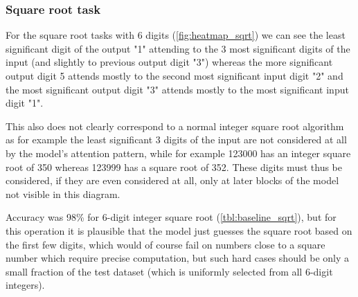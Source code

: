 \subsubsection{Square root task}


For the square root tasks with 6 digits (\cref{fig:heatmap_sqrt}) we can see the least significant digit of the output "1" attending to the 3 most significant digits of the input (and slightly to previous output digit "3") whereas the more significant output digit 5 attends mostly to the second most significant input digit "2" and the most significant output digit "3" attends mostly to the most significant input digit "1".

This also does not clearly correspond to a normal integer square root algorithm as for example the least significant 3 digits of the input are not considered at all by the model's attention pattern, while for example 123000 has an integer square root of 350 whereas 123999 has a square root of 352. These digits must thus be considered, if they are even considered at all, only at later blocks of the model not visible in this diagram.

Accuracy was 98\% for 6-digit integer square root (\cref{tbl:baseline_sqrt}), but for this operation it is plausible that the model just guesses the square root based on the first few digits, which would of course fail on numbers close to a square number which require precise computation, but such hard cases should be only a small fraction of the test dataset (which is uniformly selected from all 6-digit integers).
